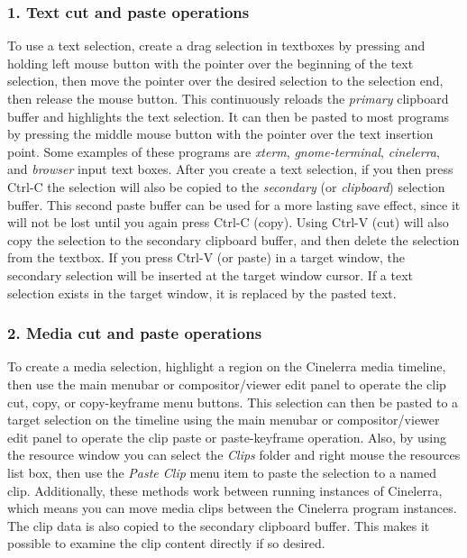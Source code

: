 \subsubsection*{1. Text cut and paste operations}%
\label{ssub:text_cut_paste_operations}

To use a text selection, create a drag selection in textboxes by pressing and holding left mouse button with the pointer over the beginning of the text selection, then move the pointer over the desired selection to the selection end, then release the mouse button.  This continuously reloads the \textit{primary} clipboard buffer and highlights the text selection.  It can then be pasted to most programs by pressing the middle mouse button with the pointer over the text insertion point.  Some examples of these programs are \textit{xterm}, \textit{gnome-terminal}, \textit{cinelerra}, and \textit{browser} input text boxes.  After you create a text selection, if you then press Ctrl-C the selection will also be copied to the \textit{secondary} (or \textit{clipboard}) selection buffer.  This second paste buffer can be used for a more lasting save effect, since it will not be lost until you again press Ctrl-C (copy).  Using Ctrl-V (cut) will also copy the selection to the secondary clipboard buffer, and then delete the selection from the textbox.  If you press Ctrl-V (or paste) in a target window, the secondary selection will be inserted at the target window cursor.  If a text selection exists in the target window, it is replaced by the pasted text.

\subsubsection*{2. Media cut and paste operations}%
\label{ssub:media_cut_paste_operations}

To create a media selection, highlight a region on the Cinelerra media timeline, then use the main menubar or compositor/viewer edit panel to operate the clip cut, copy, or copy-keyframe menu buttons.  This selection can then be pasted to a target selection on the timeline using the main menubar or compositor/viewer edit panel to operate the clip paste or paste-keyframe operation.  Also, by using the resource window you can select the \textit{Clips} folder and right mouse the resources list box, then use the \textit{Paste Clip} menu item to paste the selection to a named clip.  Additionally, these methods work between running instances of Cinelerra, which means you can move media clips between the Cinelerra program instances.  The clip data is also copied to the secondary clipboard buffer.  This makes it possible to examine the clip content directly if so desired.

